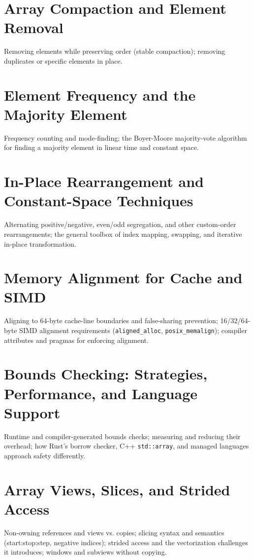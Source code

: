 \chapter{Array Compaction and Element Removal}
Removing elements while preserving order (stable compaction); removing duplicates or specific elements in place.

\chapter{Element Frequency and the Majority Element}
Frequency counting and mode-finding; the Boyer-Moore majority-vote algorithm for finding a majority element in linear time and constant space.

\chapter{In-Place Rearrangement and Constant-Space Techniques}
Alternating positive/negative, even/odd segregation, and other custom-order rearrangements; the general toolbox of index mapping, swapping, and iterative in-place transformation.


\chapter{Memory Alignment for Cache and SIMD}
Aligning to 64-byte cache-line boundaries and false-sharing prevention; 16/32/64-byte SIMD alignment requirements (\texttt{aligned\_alloc}, \texttt{posix\_memalign}); compiler attributes and pragmas for enforcing alignment.

\chapter{Bounds Checking: Strategies, Performance, and Language Support}
Runtime and compiler-generated bounds checks; measuring and reducing their overhead; how Rust's borrow checker, C++ \texttt{std::array}, and managed languages approach safety differently.

\chapter{Array Views, Slices, and Strided Access}
Non-owning references and views vs. copies; slicing syntax and semantics (start:stop:step, negative indices); strided access and the vectorization challenges it introduces; windows and subviews without copying.

